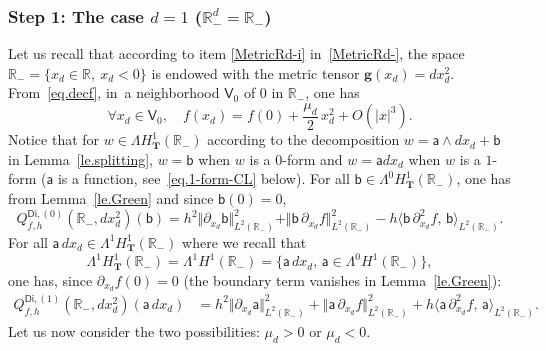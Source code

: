 \documentclass[10pt]{amsart}
\newcommand{\mbf}[1]{\mathbf{#1}}
\let\lp\langle
\let\rp\rangle
\theoremstyle{plain}
\theoremstyle{definition}
\begin{document}
\subsubsection*{Step 1: The case $d=1$ (\ie $\mathbb R^d_-=\mathbb R_-$)}
Let us recall that according to item \eqref{MetricRd-i} in~\ref{MetricRd-}, the
space $\mathbb R_-=\{x_d\in \mathbb R,\ x_d<0\}$ is endowed with the
metric tensor $\mbf g(x_d)=dx_d^2$.
From~\eqref{eq.decf}, in~a neighborhood $\mathsf V_0$ of $0$ in $\mathbb R_-$, one has
\[
\forall x_d\in \mathsf V_0,\quad f(x_d)= f(0)+ \frac{\mu_{d}}{2}\, x_d^2 +O(|x|^3).
\]
Notice that for $w\in \Lambda H^1_{\mbf T}(\mathbb R_-)$ according to the decomposition $w=\mathsf a\wedge dx_d+\mathsf b$ in Lemma~\ref{le.splitting}, $w=\mathsf b$ when $w$ is a $0$-form and $w=\mathsf a dx_d$ when $w$ is a $1$-form ($\mathsf a$ is a function, see~\eqref{eq.1-form-CL} below).
For all $\mathsf b \in \Lambda^0 H^1_{\mbf T}(\mathbb R_-)$, one has from Lemma~\ref{le.Green} and since $\mathsf b(0)=0$,
\begin{equation}\label{eq.1bb-<}
Q_{f,h}^{\mathsf{Di},(0)}(\mathbb R_-,dx_d^2)(\mathsf b)= h^2 \Vert \partial_{x_d} \mathsf b \Vert_{L^2(\mathbb R_-)}^2+ \Vert \mathsf b\, \partial_{x_d} f \Vert_{L^2(\mathbb R_-)}^2-h\lp \mathsf b \, \partial_{x_d}^2 f, \, \mathsf b \rp_{L^2(\mathbb R_-)}.
\end{equation}
For all $\mathsf a \, dx_d\in \Lambda^1 H^1_{\mbf T}(\mathbb R_-)$ where we recall that
\begin{equation}\label{eq.1-form-CL}
\Lambda^1 H^1_{\mbf T}(\mathbb R_-) =\Lambda^1 H^1(\mathbb R_-)=\big \{\mathsf a \, dx_d,\, \mathsf a \in \Lambda^0 H^1(\mathbb R_-)\big \},
\end{equation}
one has, since $\partial_{x_d} f(0)=0$ (the boundary term vanishes in Lemma~\ref{le.Green}):
\begin{align*}
Q_{f,h}^{\mathsf{Di},(1)}(\mathbb R_-, dx_d^2)(\mathsf a \, dx_d)& \! = \! h^2\big \Vert \partial_{x_d} \mathsf a \big \Vert_{L^2(\mathbb
R_-)}^2
\!+\! \big
\Vert
\mathsf
a\,
\partial_{x_d}
f\big
\Vert_{L^2(\mathbb
R_-)}^2 \!+\! h\lp \mathsf a \, \partial_{x_d}^2 f, \, \mathsf a \rp_{L^2(\mathbb R_-)}.
\end{align*}
Let us now consider the two possibilities: $\mu_d>0$ or $\mu_d < 0$.
\end{document}
